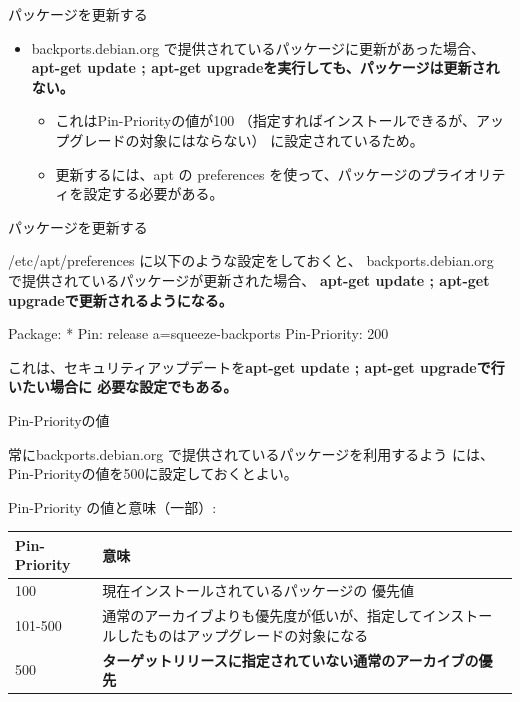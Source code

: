 \begin{frame}[containsverbatim]{パッケージを更新する}

\begin{itemize}
\item backports.debian.org で提供されているパッケージに更新があった場合、
\bf{apt-get update ; apt-get upgrade}を実行しても、パッケージは更新されない。
\begin{itemize}
\item これはPin-Priorityの値が100
（指定すればインストールできるが、アップグレードの対象にはならない）
に設定されているため。
\item 更新するには、apt の preferences を使って、パッケージのプライオリティを設定する必要がある。
\end{itemize}
\end{itemize}

\end{frame}

\begin{frame}[containsverbatim]{パッケージを更新する}

/etc/apt/preferences に以下のような設定をしておくと、
backports.debian.org で提供されているパッケージが更新された場合、
\bf{apt-get update ; apt-get upgrade}で更新されるようになる。

\begin{commandline}
Package: *
Pin: release a=squeeze-backports
Pin-Priority: 200
\end{commandline}

これは、セキュリティアップデートを\bf{apt-get update ; apt-get
 upgrade}で行いたい場合に
必要な設定でもある。


\end{frame}

\begin{frame}[containsverbatim]{Pin-Priorityの値}

常にbackports.debian.org で提供されているパッケージを利用するよう
には、Pin-Priorityの値を500に設定しておくとよい。

Pin-Priority の値と意味（一部）:
\begin{table}[ht]
 \begin{center}
  \begin{tabular}{|l|p{20em}|}
   \hline
   Pin-Priority & 意味 \\ \hline \hline
   100     & 現在インストールされているパッケージの 優先値\\
   101-500 & 通常のアーカイブよりも優先度が低いが、指定してインストールしたものはアップグレードの対象になる\\
   500     & \bf{ターゲットリリース}に指定されていない通常のアーカイブの優先 \\
   \hline
  \end{tabular}
 \end{center}
\end{table}

\end{frame}

